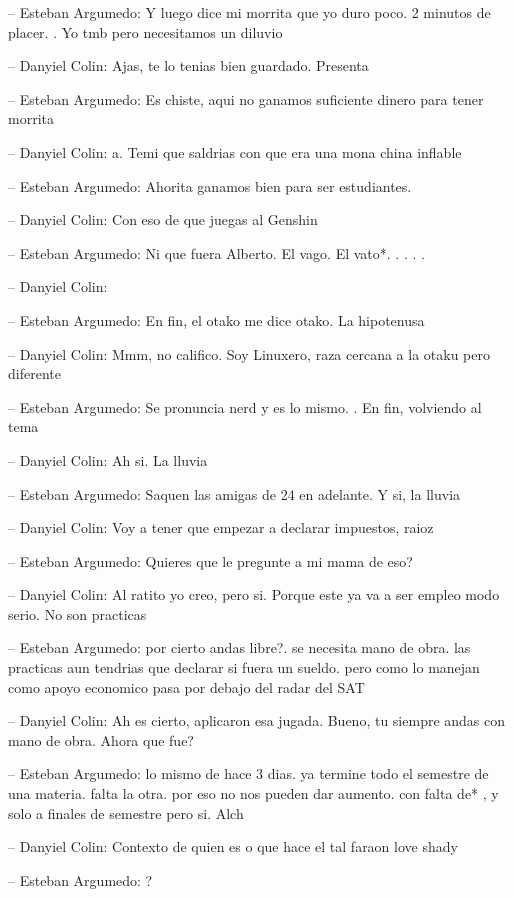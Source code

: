-- Esteban Argumedo: Y luego dice mi morrita que yo duro poco. 2 minutos
de placer. . Yo tmb pero necesitamos un diluvio

-- Danyiel Colin: Ajas, te lo tenias bien guardado. Presenta

-- Esteban Argumedo: Es chiste, aqui no ganamos suficiente dinero para
tener morrita

-- Danyiel Colin: a. Temi que saldrias con que era una mona china
inflable

-- Esteban Argumedo: Ahorita ganamos bien para ser estudiantes.

-- Danyiel Colin: Con eso de que juegas al Genshin

-- Esteban Argumedo: Ni que fuera Alberto. El vago. El vato*. . . . .

-- Danyiel Colin:

-- Esteban Argumedo: En fin, el otako me dice otako. La hipotenusa

-- Danyiel Colin: Mmm, no califico. Soy Linuxero, raza cercana a la
otaku pero diferente

-- Esteban Argumedo: Se pronuncia nerd y es lo mismo. . En fin,
volviendo al tema

-- Danyiel Colin: Ah si. La lluvia

-- Esteban Argumedo: Saquen las amigas de 24 en adelante. Y si, la
lluvia

-- Danyiel Colin: Voy a tener que empezar a declarar impuestos, raioz

-- Esteban Argumedo: Quieres que le pregunte a mi mama de eso?

-- Danyiel Colin: Al ratito yo creo, pero si. Porque este ya va a ser
empleo modo serio. No son practicas

-- Esteban Argumedo: por cierto andas libre?. se necesita mano de obra.
las practicas aun tendrias que declarar si fuera un sueldo. pero como lo
manejan como apoyo economico pasa por debajo del radar del SAT

-- Danyiel Colin: Ah es cierto, aplicaron esa jugada. Bueno, tu siempre
andas con mano de obra. Ahora que fue?

-- Esteban Argumedo: lo mismo de hace 3 dias. ya termine todo el
semestre de una materia. falta la otra. por eso no nos pueden dar
aumento. con falta de* , y solo a finales de semestre pero si. Alch

-- Danyiel Colin: Contexto de quien es o que hace el tal faraon love
shady

-- Esteban Argumedo: ?


